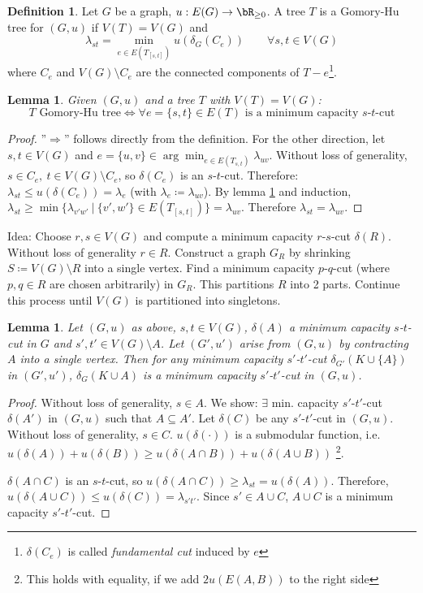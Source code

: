 \documentclass[11pt, a4paper]{article}
\newcommand{\set}[1]{\{#1\}}
\newtheorem{lemma}[theorem]{Lemma}
\theoremstyle{remark}
\theoremstyle{definition}
\newtheorem{definition}[theorem]{Definition}
\begin{document}
\begin{definition}
	Let $G$ be a graph, $u: E(G)\to\bR_{\geq0}$. A tree $T$ is a
	Gomory-Hu tree for $(G,u)$ if $V(T)=V(G)$ and
	\[\lambda_{st}=\min_{e\in E(T_{[s,t]})}u(\delta_G(C_e)) \qquad \forall s,t\in V(G)\]
	where $C_e$ and $V(G)\setminus C_e$ are the connected components of
	$T-e$\footnote{$\delta(C_e)$ is called \emph{fundamental cut} induced
		by $e$}.
\end{definition}

\begin{lemma}\label{lemma:min-cut-triangle}
	Given $(G,u)$ and a tree $T$ with $V(T)=V(G)$:
	\[T\text{ Gomory-Hu tree}\Leftrightarrow \forall e=\set{s,t}\in E(T)
		\text{ is a minimum capacity $s$-$t$-cut}\]
\end{lemma}
\begin{proof}
	''$\Rightarrow$'' follows directly from the definition. For the other
	direction, let $s,t\in V(G)$ and $e=\set{u,v}\in \arg\min_{e\in E(T_{s,t})}
		\lambda_{uv}$. Without loss of generality, $s\in C_e,\ t\in V(G)\setminus C_e$,
	so $\delta(C_e)$ is an $s$-$t$-cut. Therefore: $\lambda_{st}\leq u(\delta(C_e))
		=\lambda_e$ (with $\lambda_e\coloneqq \lambda_{uv}$). By lemma
	\ref{lemma:min-cut-triangle} and induction, $\lambda_{st}\geq\min\set{\lambda_{v'w'}\
			|\ \set{v',w'}\in E(T_{[s,t]})}=\lambda_{uv}$. Therefore $\lambda_{st}=
		\lambda_{uv}$.
\end{proof}

Idea: Choose $r,s\in V(G)$ and compute a minimum capacity $r$-$s$-cut
$\delta(R)$. Without loss of generality $r\in R$. Construct a graph
$G_R$ by shrinking $S\coloneqq V(G)\setminus R$ into a single vertex.
Find a minimum capacity $p$-$q$-cut (where $p,q\in R$ are chosen
arbitrarily) in $G_R$. This partitions $R$ into 2 parts. Continue
this process until $V(G)$ is partitioned into singletons.

\begin{lemma}\label{lemma:min-cut-contraction}
	Let $(G,u)$ as above, $s,t\in V(G)$, $\delta(A)$ a minimum capacity
	$s$-$t$-cut in $G$ and $s',t'\in V(G)\setminus A$. Let $(G',u')$ arise
	from $(G,u)$ by contracting $A$ into a single vertex. Then for any
	minimum capacity $s'$-$t'$-cut $\delta_{G'}(K\cup\set{A})$ in $(G',u')$,
	$\delta_G(K\cup A)$ is a minimum capacity $s'$-$t'$-cut in $(G,u)$.
\end{lemma}
\begin{proof}
	Without loss of generality, $s\in A$. We show: $\exists$ min. capacity
	$s'$-$t'$-cut $\delta(A')$ in $(G,u)$ such that $A\subseteq A'$. Let
	$\delta(C)$ be any $s'$-$t'$-cut in $(G,u)$. Without loss of generality,
	$s\in C$. $u(\delta(\cdot))$ is a submodular function, i.e.
	$u(\delta(A))+u(\delta(B))\geq u(\delta(A\cap B))+u(\delta(A\cup B))$
	\footnote{This holds with equality, if we add $2u(E(A,B))$ to the right side}.

	$\delta(A\cap C)$ is an $s$-$t$-cut, so $u(\delta(A\cap C))\geq \lambda_{st}
		=u(\delta(A))$. Therefore, $u(\delta(A\cup C))\leq u(\delta(C))=\lambda_{s't'}$.
	Since $s'\in A\cup C$, $A\cup C$ is a minimum capacity $s'$-$t'$-cut.
\end{proof}
\end{document}
